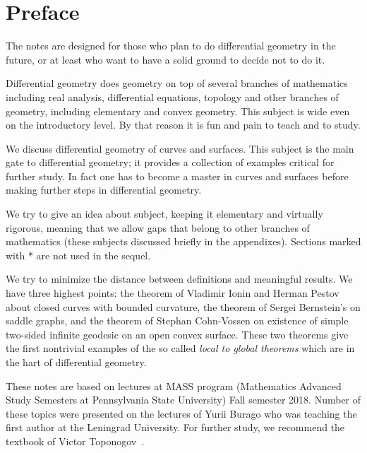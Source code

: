 
\chapter*{Preface}

The notes are designed for those who plan to do differential geometry in the future,
or at least who want to have a solid ground to decide not to do it.

Differential geometry does geometry on top of several branches of mathematics including real analysis, differential equations, topology and other branches of geometry, including elementary and convex geometry.
This subject is wide even on the introductory level. 
By that reason it is fun and pain to teach and to study.

We discuss differential geometry of curves and surfaces.
This subject is the main gate to differential geometry;
it provides a collection of examples critical for further study.
In fact one has to become a master in curves and surfaces before making further steps in differential geometry.

We try to give an idea about subject, keeping it elementary and virtually rigorous, meaning that we allow gaps that belong to other branches of mathematics (these subjects discussed briefly in the appendixes).
Sections marked with * are not used in the sequel.

We try to minimize the distance between definitions and meaningful results.
We have three highest points:
the theorem of Vladimir Ionin and Herman Pestov about closed curves with bounded curvature,
the theorem of Sergei Bernstein's on saddle graphs,
and the theorem of Stephan Cohn-Vossen on existence of simple two-sided infinite geodesic on an open convex surface.
These two theorems give the first nontrivial examples of the so called \emph{local to global theorems} which are in the hart of differential geometry. 

These notes are based on lectures at MASS program (Mathematics Advanced Study Semesters at Pennsylvania State University) Fall semester 2018.
Number of these topics were presented on the lectures of Yurii Burago who was teaching the first author at the Leningrad University.
For further study, we recommend the textbook of Victor Toponogov~\cite{toponogov}.

